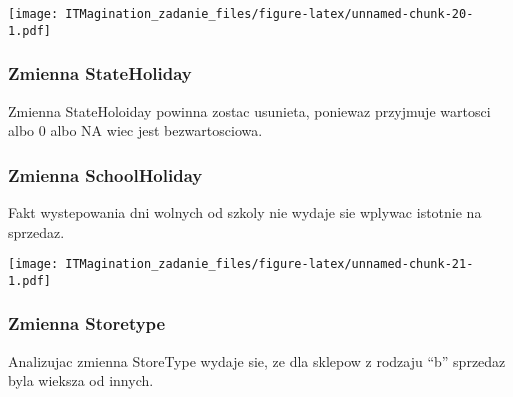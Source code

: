 \documentclass[]{article}
\newenvironment{Shaded}{\begin{snugshade}}{\end{snugshade}}
\newcommand{\DataTypeTok}[1]{\textcolor[rgb]{0.13,0.29,0.53}{#1}}
\newcommand{\DecValTok}[1]{\textcolor[rgb]{0.00,0.00,0.81}{#1}}
\newcommand{\KeywordTok}[1]{\textcolor[rgb]{0.13,0.29,0.53}{\textbf{#1}}}
\newcommand{\NormalTok}[1]{#1}
\newcommand{\OperatorTok}[1]{\textcolor[rgb]{0.81,0.36,0.00}{\textbf{#1}}}
\newcommand{\StringTok}[1]{\textcolor[rgb]{0.31,0.60,0.02}{#1}}
\begin{document}
\texttt{[image: ITMagination\_zadanie\_files/figure-latex/unnamed-chunk-20-1.pdf]}

\hypertarget{zmienna-stateholiday}{%
\subsubsection{Zmienna StateHoliday}\label{zmienna-stateholiday}}

Zmienna StateHoloiday powinna zostac usunieta, poniewaz przyjmuje
wartosci albo 0 albo NA wiec jest bezwartosciowa.

\hypertarget{zmienna-schoolholiday}{%
\subsubsection{Zmienna SchoolHoliday}\label{zmienna-schoolholiday}}

Fakt wystepowania dni wolnych od szkoly nie wydaje sie wplywac istotnie
na sprzedaz.

\begin{Shaded}
\end{Shaded}

\texttt{[image: ITMagination\_zadanie\_files/figure-latex/unnamed-chunk-21-1.pdf]}

\hypertarget{zmienna-storetype}{%
\subsubsection{Zmienna Storetype}\label{zmienna-storetype}}

Analizujac zmienna StoreType wydaje sie, ze dla sklepow z rodzaju ``b''
sprzedaz byla wieksza od innych.
\end{document}
